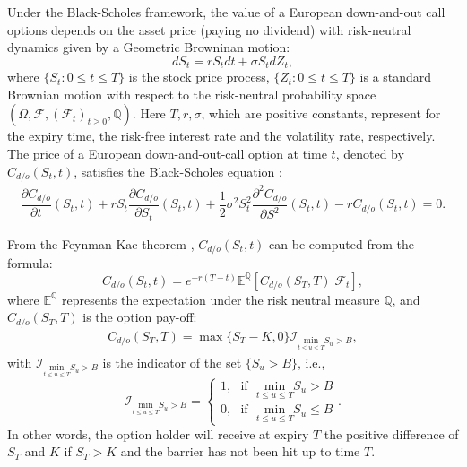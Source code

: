 \documentclass[12pt]{article}
\newcommand{\beq}{\begin{equation}}
\newcommand{\eeq}{\end{equation}}
\def\min{{\mbox{min}}}
\begin{document}
Under the Black-Scholes framework, the value of a European down-and-out call options depends on the asset price (paying no dividend) with risk-neutral dynamics given by a Geometric Browninan motion: 
\beq dS_t=rS_tdt+\sigma S_t dZ_t,\label{1.2.1}\eeq
where $\{S_t: 0\leq t\leq T\}$ is the stock price process, $\{Z_t: 0\leq t\leq T\}$ is a standard Brownian motion with respect to the risk-neutral probability space $(\Omega, \mathcal F, (\mathcal F_t)_{t\ge 0},\mathbb Q)$. Here $T, r, \sigma$, which are positive constants, represent for the expiry time, the risk-free interest rate and the volatility rate, respectively.
The price of a European down-and-out-call option at time $t$, denoted by $C_{d/o}(S_t,t)$, satisfies the Black-Scholes equation \cite{Merton73}:
\begin{align*}
	\dfrac{\partial C_{d/o}}{\partial t}(S_t, t)+rS_t\dfrac{\partial C_{d/o}}{\partial S_t}(S_t, t)+\dfrac{1}{2}\sigma^2S_t^2\dfrac{\partial^2C_{d/o}}{\partial S^2}(S_t, t)-rC_{d/o}(S_t, t)=0.
\end{align*}

From the Feynman-Kac theorem \cite[p. 268]{shreve2004stochastic}, $C_{d/o}(S_t,t)$ can be computed from the formula: $$C_{d/o}(S_t,t)= e^{-r(T-t)}\mathbb{E}^\mathbb{Q}[C_{d/o}(S_T,T)|\mathcal{F}_t],$$
where $\mathbb{E}^\mathbb{Q}$ represents the expectation under the risk neutral measure $\mathbb Q$, and $C_{d/o}(S_T, T)$ is the option pay-off:
\begin{align*}
	C_{d/o}(S_T, T)=\max\{S_T-K, 0\}\mathcal{I}_{\underset{t\leq u\leq T}\min S_u > B},
\end{align*}
with $\mathcal{I}_{\underset{t\leq u\leq T}\min S_u > B}$ is the indicator of the set $\{S_u > B\}$, i.e., $$\mathcal{I}_{\underset{t\leq u\leq T}\min S_u > B}=\begin{cases}
1,~~~\text{if}~~~\underset{t\leq u\leq T}\min S_u > B\\
0,~~~\text{if}~~~\underset{t\leq u\leq T}\min S_u \le B
\end{cases}.$$
In other words, the option holder will receive at expiry $T$ the positive difference of $S_T$ and $K$ if $S_T>K$ and the barrier has not been hit up to time $T$.
\end{document}
